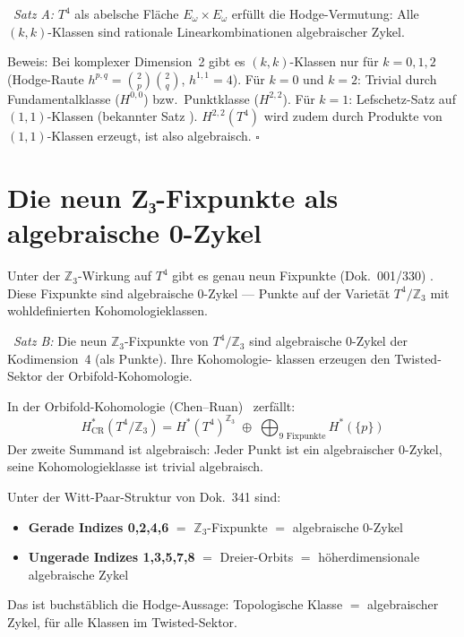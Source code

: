 \noindent \BM\ \textit{Satz A:} $T^4$ als abelsche Fläche
$E_\omega\times E_\omega$ erfüllt die
Hodge-Vermutung: Alle $(k,k)$-Klassen sind rationale Linearkombinationen
algebraischer Zykel.

Beweis: Bei komplexer Dimension~2 gibt es $(k,k)$-Klassen nur für
$k = 0,1,2$ (Hodge-Raute $h^{p,q} = \binom{2}{p}\binom{2}{q}$, $h^{1,1} = 4$).
Für $k=0$ und $k=2$: Trivial durch Fundamentalklasse ($H^{0,0}$)
bzw.\ Punktklasse ($H^{2,2}$).
Für $k=1$: Lefschetz-Satz auf $(1,1)$-Klassen (bekannter Satz \EM).
$H^{2,2}(T^4)$ wird zudem durch Produkte von $(1,1)$-Klassen erzeugt,
ist also algebraisch. \hfill$\square$

\section{Die neun Z₃-Fixpunkte als algebraische 0-Zykel}

Unter der $\mathbb{Z}_3$-Wirkung auf $T^4$ gibt es genau neun Fixpunkte
(Dok.~001/330) \BM. Diese Fixpunkte sind algebraische 0-Zykel — Punkte auf
der Varietät $T^4/\mathbb{Z}_3$ mit wohldefinierten Kohomologieklassen.

\BM\ \textit{Satz B:} Die neun $\mathbb{Z}_3$-Fixpunkte von $T^4/\mathbb{Z}_3$
sind algebraische 0-Zykel der Kodimension~4 (als Punkte). Ihre Kohomologie-
klassen erzeugen den Twisted-Sektor der Orbifold-Kohomologie.

In der Orbifold-Kohomologie (Chen--Ruan) \QM\ zerfällt:
\[
H^*_{\mathrm{CR}}(T^4/\mathbb{Z}_3) = H^*(T^4)^{\mathbb{Z}_3}
\;\oplus\; \bigoplus_{\text{9 Fixpunkte}} H^*(\{p\})
\]
Der zweite Summand ist algebraisch: Jeder Punkt ist ein algebraischer
0-Zykel, seine Kohomologieklasse ist trivial algebraisch. \EM

Unter der Witt-Paar-Struktur von Dok.~341 sind:
\begin{itemize}
\item \textbf{Gerade Indizes 0,2,4,6} $=$ $\mathbb{Z}_3$-Fixpunkte
      $=$ algebraische 0-Zykel \BM
\item \textbf{Ungerade Indizes 1,3,5,7,8} $=$ Dreier-Orbits
      $=$ höherdimensionale algebraische Zykel \BM
\end{itemize}

Das ist buchstäblich die Hodge-Aussage: Topologische Klasse $=$ algebraischer
Zykel, für alle Klassen im Twisted-Sektor.

